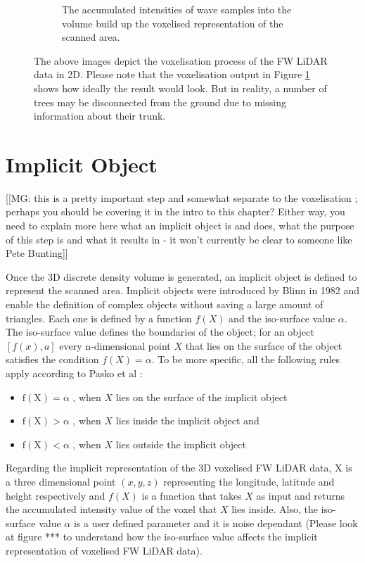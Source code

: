 \documentclass{subfiles}
\begin{document}
\begin{figure} [h!]
\begin{subfigure}[t]{.31\textwidth}
	\caption{The accumulated intensities of wave samples into the volume build up the voxelised representation of the scanned area.} 
	\label{fig:VoxelisationC_voxelised}
\end{subfigure}
\caption[Voxelisation of FW LiDAR data]{The above images depict the voxelisation process of the FW LiDAR data in 2D. Please note that the voxelisation output in Figure \ref{fig:VoxelisationC_voxelised} shows how ideally the result would look. But in reality, a number of trees may be disconnected from the ground due to missing information about their trunk.}
\label{fig:Voxelisation}
\end{figure}


\section{Implicit Object}

[[MG: this is a pretty important step and somewhat separate to the voxelisation ; perhaps you should be covering it in the intro to this chapter?  Either way, you need to explain more here what an implicit object is and does, what the purpose of this step is and what it results in - it won't currently be clear to someone like Pete Bunting]]

\par Once the 3D discrete density volume is generated, an implicit object is defined to represent the scanned area. Implicit objects were introduced by Blinn in 1982 \cite{Blinn1982} and enable the definition of complex objects without saving a large amount of triangles. Each one is defined by a function $ \mathit{f(X)} $ and the iso-surface value $\alpha$. The iso-surface value defines the boundaries of the object; for an object $ [f(x),a]$ every n-dimensional point $ \mathit{X} $  that lies on the surface of the object satisfies the condition $ \mathit{f(X)=\alpha }  $. To be more specific, all the following rules apply according to Pasko et al \cite{Pasko1994}: 
\begin{itemize}
	\item $	\mathrm{f(X) = \alpha }$ , when $X$ lies on the surface of the implicit object
	\item $	\mathrm{f(X) > \alpha }$ , when $X$ lies inside the implicit object and
	\item $	\mathrm{f(X) < \alpha }$ , when $X$ lies outside the implicit object	 
\end{itemize}


\par Regarding the implicit representation of the 3D voxelised FW LiDAR data, X is a three dimensional point $\mathit{(x, y, z) }$ representing the longitude, latitude and height respectively and ${f(X)}$ is a function that takes  $\mathit{X}$ as input and returns the accumulated intensity value of the voxel that  $\mathit{X}$ lies inside. Also, the iso-surface value $\mathit{\alpha }$ is a user defined parameter and it is noise dependant (Please look at figure *** to understand how the iso-surface value affects the implicit representation of voxelised FW LiDAR data). 
\end{document}
